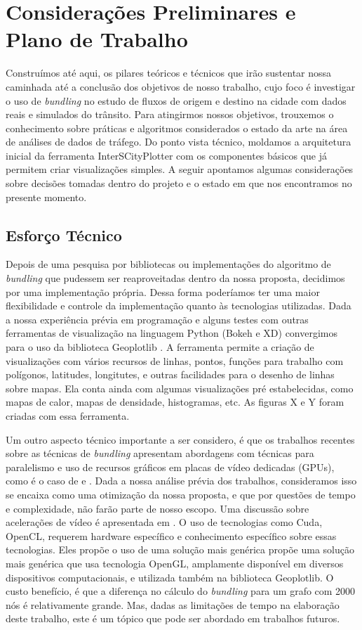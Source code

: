 \chapter{Considerações Preliminares e Plano de Trabalho}
\label{cap:plano-de-trabalho}

  Construímos até aqui, os pilares teóricos e técnicos que irão sustentar nossa
caminhada até a conclusão dos objetivos de nosso trabalho, cujo foco é
investigar o uso de \emph{bundling} no estudo de fluxos de origem e destino na
cidade com dados reais e simulados do trânsito. Para atingirmos nossos
objetivos, trouxemos o conhecimento sobre práticas e algoritmos
considerados o estado da arte na área de análises de dados de tráfego. Do ponto
vista técnico, moldamos a arquitetura inicial da ferramenta InterSCityPlotter
com os componentes básicos que já permitem criar visualizações simples. A
seguir apontamos algumas considerações sobre decisões tomadas dentro do projeto
e o estado em que nos encontramos no presente momento.


\section{Esforço Técnico}

  Depois de uma pesquisa por bibliotecas ou implementações do algoritmo de
\emph{bundling} que pudessem ser reaproveitadas dentro da nossa proposta,
decidimos por uma implementação própria. Dessa forma poderíamos ter uma maior
flexibilidade e controle da implementação quanto às tecnologias utilizadas.
Dada a nossa experiência prévia em programação e alguns testes com outras
ferramentas de visualização na linguagem Python (Bokeh e XD) convergimos
para o uso da biblioteca Geoplotlib \citet{}. A ferramenta permite a criação
de visualizações com vários recursos de linhas, pontos, funções para trabalho
com polígonos, latitudes, longitutes, e outras facilidades para o desenho
de linhas sobre mapas. Ela conta ainda com algumas visualizações pré estabelecidas,
como mapas de calor, mapas de densidade, histogramas, etc. As figuras X e Y foram
criadas com essa ferramenta.

Um outro aspecto técnico importante a ser considero, é que os trabalhos recentes sobre
as técnicas de \emph{bundling} apresentam abordagens com técnicas para
paralelismo e uso de recursos gráficos em placas de vídeo dedicadas (GPUs),
como é o caso de \citet{Hurter2012} e \citet{ADEB}. Dada a nossa análise prévia
dos trabalhos, consideramos isso se encaixa como uma otimização da nossa proposta, e que
por questões de tempo e complexidade, não farão parte de nosso escopo.
Uma discussão sobre acelerações de vídeo é apresentada em
\citet{}. O uso de tecnologias como Cuda, OpenCL, requerem hardware específico
e conhecimento específico sobre essas tecnologias. Eles propõe o uso
de uma solução mais genérica propõe uma solução mais genérica que usa tecnologia OpenGL, amplamente
disponível em diversos dispositivos computacionais, e utilizada também na
biblioteca Geoplotlib. O custo benefício, é que a diferença no cálculo
do \emph{bundling} para um grafo com 2000 nós é relativamente grande. Mas,
dadas as limitações de tempo na elaboração deste trabalho, este é um tópico
que pode ser abordado em trabalhos futuros.

